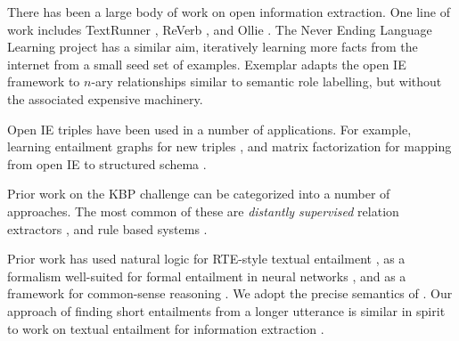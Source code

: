 There has been a large body of work on open information extraction.
One line of work includes
  TextRunner \cite{key:2007yates-textrunner},
  ReVerb \cite{key:2011fader-reverb},
  and Ollie \cite{key:2012mausam-ollie}.
The Never Ending Language Learning project \cite{key:2010carlson-nell}
  has a similar aim, iteratively learning more facts from the internet
  from a small seed set of examples.
Exemplar \cite{key:2013mesquita-exemplar} adapts the open IE framework to
  $n$-ary relationships similar to semantic role labelling, but without the
  associated expensive machinery.

Open IE triples have been used in a number of applications.
For example, learning entailment graphs for new triples
  \cite{key:2011berant-entailment}, and
  matrix factorization for mapping from open IE to structured schema
  \cite{key:2012yao-schemas,key:2013riedel-schemas}.

Prior work on the KBP challenge can be categorized into a number of approaches.
The most common of these are \textit{distantly supervised} relation extractors
  \cite{key:1999craven-distsup,key:2007wu-distsup,key:2009mintz-distsup,key:2011sun-kbp},
  and rule based systems
  \cite{key:1997soderland-kbp,key:2010grishman-kbp,key:2010chen-kbp}.

Prior work has used natural logic \cite{key:2008vanbenthem-natlog} 
  for RTE-style textual entailment \cite{key:2009maccartney-natlog}, as
  a formalism well-suited for formal entailment in neural networks
  \cite{key:2013bowman-natlog}, and as a framework for common-sense reasoning
  \cite{key:2013angeli-truth}.
We adopt the precise semantics of .
Our approach of finding short entailments from a longer utterance is similar
  in spirit to work on textual entailment for information extraction
  \cite{key:2006romano-ie}.

